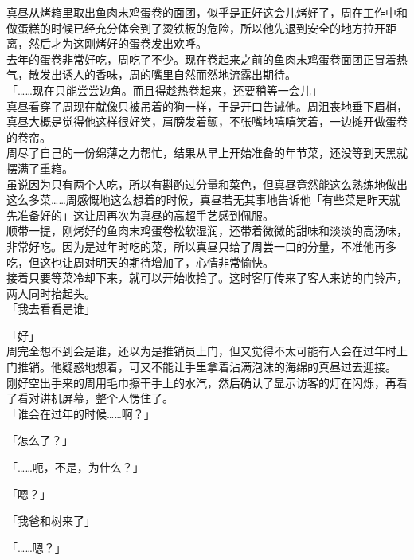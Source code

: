 真昼从烤箱里取出鱼肉末鸡蛋卷的面团，似乎是正好这会儿烤好了，周在工作中和做蛋糕的时候已经充分体会到了烫铁板的危险，所以他先退到安全的地方拉开距离，然后才为这刚烤好的蛋卷发出欢呼。\\

去年的蛋卷非常好吃，周吃了不少。现在卷起来之前的鱼肉末鸡蛋卷面团正冒着热气，散发出诱人的香味，周的嘴里自然而然地流露出期待。\\

「……现在只能尝尝边角。而且得趁热卷起来，还要稍等一会儿」\\

真昼看穿了周现在就像只被吊着的狗一样，于是开口告诫他。周沮丧地垂下眉梢，真昼大概是觉得他这样很好笑，肩膀发着颤，不张嘴地嘻嘻笑着，一边摊开做蛋卷的卷帘。\\

周尽了自己的一份绵薄之力帮忙，结果从早上开始准备的年节菜，还没等到天黑就摆满了重箱。\\

虽说因为只有两个人吃，所以有斟酌过分量和菜色，但真昼竟然能这么熟练地做出这么多菜……周感慨地这么想着的时候，真昼若无其事地告诉他「有些菜是昨天就先准备好的」这让周再次为真昼的高超手艺感到佩服。\\

顺带一提，刚烤好的鱼肉末鸡蛋卷松软湿润，还带着微微的甜味和淡淡的高汤味，非常好吃。因为是过年时吃的菜，所以真昼只给了周尝一口的分量，不准他再多吃，但这也让周对明天的期待增加了，心情非常愉快。\\

接着只要等菜冷却下来，就可以开始收拾了。这时客厅传来了客人来访的门铃声，两人同时抬起头。\\

「我去看看是谁」

「好」\\

周完全想不到会是谁，还以为是推销员上门，但又觉得不太可能有人会在过年时上门推销。他疑惑地想着，可又不能让手里拿着沾满泡沫的海绵的真昼过去迎接。\\

刚好空出手来的周用毛巾擦干手上的水汽，然后确认了显示访客的灯在闪烁，再看了看对讲机屏幕，整个人愣住了。\\

「谁会在过年的时候……啊？」

「怎么了？」

「……呃，不是，为什么？」

「嗯？」

「我爸和树来了」

「……嗯？」\\

